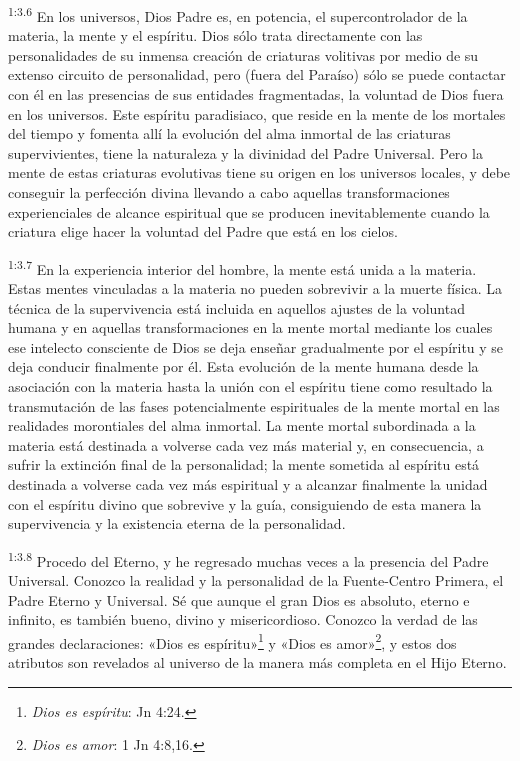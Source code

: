 \par
\textsuperscript{1:3.6} En los universos, Dios Padre es, en potencia, el supercontrolador de la materia, la mente y el espíritu. Dios sólo trata directamente con las personalidades de su inmensa creación de criaturas volitivas por medio de su extenso circuito de personalidad, pero (fuera del Paraíso) sólo se puede contactar con él en las presencias de sus entidades fragmentadas, la voluntad de Dios fuera en los universos. Este espíritu paradisiaco, que reside en la mente de los mortales del tiempo y fomenta allí la evolución del alma inmortal de las criaturas supervivientes, tiene la naturaleza y la divinidad del Padre Universal. Pero la mente de estas criaturas evolutivas tiene su origen en los universos locales, y debe conseguir la perfección divina llevando a cabo aquellas transformaciones experienciales de alcance espiritual que se producen inevitablemente cuando la criatura elige hacer la voluntad del Padre que está en los cielos.

\par
\textsuperscript{1:3.7} En la experiencia interior del hombre, la mente está unida a la materia. Estas mentes vinculadas a la materia no pueden sobrevivir a la muerte física. La técnica de la supervivencia está incluida en aquellos ajustes de la voluntad humana y en aquellas transformaciones en la mente mortal mediante los cuales ese intelecto consciente de Dios se deja enseñar gradualmente por el espíritu y se deja conducir finalmente por él. Esta evolución de la mente humana desde la asociación con la materia hasta la unión con el espíritu tiene como resultado la transmutación de las fases potencialmente espirituales de la mente mortal en las realidades morontiales del alma inmortal. La mente mortal subordinada a la materia está destinada a volverse cada vez más material y, en consecuencia, a sufrir la extinción final de la personalidad; la mente sometida al espíritu está destinada a volverse cada vez más espiritual y a alcanzar finalmente la unidad con el espíritu divino que sobrevive y la guía, consiguiendo de esta manera la supervivencia y la existencia eterna de la personalidad.

\par
\textsuperscript{1:3.8} Procedo del Eterno, y he regresado muchas veces a la presencia del Padre Universal. Conozco la realidad y la personalidad de la Fuente-Centro Primera, el Padre Eterno y Universal. Sé que aunque el gran Dios es absoluto, eterno e infinito, es también bueno, divino y misericordioso. Conozco la verdad de las grandes declaraciones: «Dios es espíritu»\footnote{\textit{Dios es espíritu}: Jn 4:24.} y «Dios es amor»\footnote{\textit{Dios es amor}: 1 Jn 4:8,16.}, y estos dos atributos son revelados al universo de la manera más completa en el Hijo Eterno.

